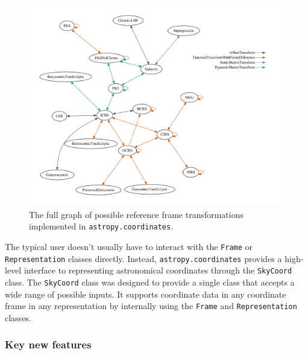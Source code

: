 \documentclass[modern]{aastex61}
\begin{document}
\begin{figure}
\includegraphics[width=\textwidth]{coordinates_graph.pdf}
\caption{
    The full graph of possible reference frame transformations implemented in
    \texttt{astropy.coordinates}.
    \label{fig:frame-transform-graph}
}
\end{figure}

The typical user doesn't usually have to interact with the \texttt{Frame} or
\texttt{Representation} classes directly.
Instead, \texttt{astropy.coordinates} provides a high-level interface to
representing astronomical coordinates through the \texttt{SkyCoord} class.
The \texttt{SkyCoord} class was designed to provide a single class that
accepts a wide range of possible inputs.
It supports coordinate data in any coordinate frame in any representation by
internally using the \texttt{Frame} and \texttt{Representation} classes.

\subsubsection{Key new features}
\end{document}
